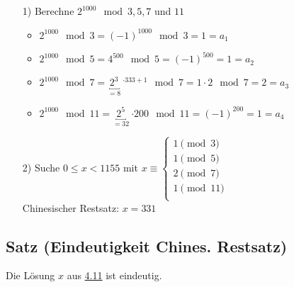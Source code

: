 \documentclass[a4paper, 12pt,titlepage, pdf, headsepline]{scrartcl}
\renewcommand{\>}{\rightarrow}
\renewcommand{\*}{\cdot}
\begin{document}
\begin{itemize}
		      	\begin{itemize}
		      		\item[1)] Berechne $2^{1000} \mod 3,5,7$ und $11$
		      		      \begin{itemize}
		      		      	\item $2^{1000} \mod 3 = (-1)^{1000} \mod 3 = 1=a_1$
		      		      	\item $2^{1000} \mod 5 = 4^{500} \mod 5 = (-1)^{500} = 1=a_2$
		      		      	\item $2^{1000} \mod 7 = \underbracket{2^3}_{=8}~^{\*333+1} \mod 7 = 1 \cdot 2\mod 7 = 2=a_3$
		      		      	\item $2^{1000} \mod 11 = \underbracket{2^5}_{=32}~{\*200} \mod 11 = (-1)^{200} = 1=a_4$
		      		      \end{itemize}
		      		\item[2)] Suche $0 \leq x < 1155$ mit $x \equiv \begin{cases*}
		      		      1 \pmod{3}\\
		      		      1 \pmod {5}\\
		      		      2 \pmod {7}\\
		      		      1 \pmod{ 11}\\
		      		\end{cases*}$\\
		      		Chinesischer Restsatz: $x = 331$
		      	\end{itemize}
		      	\end{itemize}
		      	\subsection{Satz (Eindeutigkeit Chines. Restsatz)}
		      	\label{4.13}
		      	Die Lösung $x$ aus \hyperref[4.11]{4.11} ist eindeutig.
\end{document}
